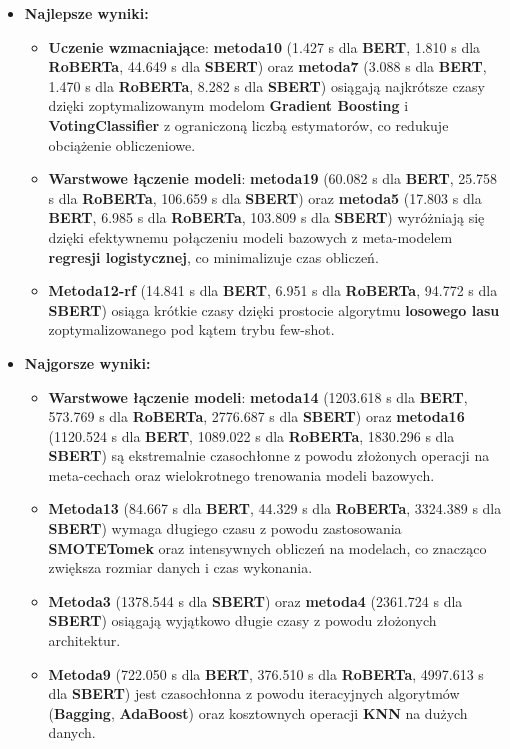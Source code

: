 \begin{itemize}
	\item \textbf{Najlepsze wyniki:}
	      \begin{itemize}
		      \item \textbf{Uczenie wzmacniające}: \textbf{metoda10} (1.427 s dla \textbf{BERT}, 1.810 s dla \textbf{RoBERTa}, 44.649 s dla \textbf{SBERT}) oraz \textbf{metoda7} (3.088 s dla \textbf{BERT}, 1.470 s dla \textbf{RoBERTa}, 8.282 s dla \textbf{SBERT}) osiągają najkrótsze czasy dzięki zoptymalizowanym modelom \textbf{Gradient Boosting} i \textbf{VotingClassifier} z ograniczoną liczbą estymatorów, co redukuje obciążenie obliczeniowe.
		      \item \textbf{Warstwowe łączenie modeli}: \textbf{metoda19} (60.082 s dla \textbf{BERT}, 25.758 s dla \textbf{RoBERTa}, 106.659 s dla \textbf{SBERT}) oraz \textbf{metoda5} (17.803 s dla \textbf{BERT}, 6.985 s dla \textbf{RoBERTa}, 103.809 s dla \textbf{SBERT}) wyróżniają się dzięki efektywnemu połączeniu modeli bazowych z meta-modelem \textbf{regresji logistycznej}, co minimalizuje czas obliczeń.
		      \item \textbf{Metoda12-rf} (14.841 s dla \textbf{BERT}, 6.951 s dla \textbf{RoBERTa}, 94.772 s dla \textbf{SBERT}) osiąga krótkie czasy dzięki prostocie algorytmu \textbf{losowego lasu} zoptymalizowanego pod kątem trybu few-shot.
	      \end{itemize}
	\item \textbf{Najgorsze wyniki:}
	      \begin{itemize}
		      \item \textbf{Warstwowe łączenie modeli}: \textbf{metoda14} (1203.618 s dla \textbf{BERT}, 573.769 s dla \textbf{RoBERTa}, 2776.687 s dla \textbf{SBERT}) oraz \textbf{metoda16} (1120.524 s dla \textbf{BERT}, 1089.022 s dla \textbf{RoBERTa}, 1830.296 s dla \textbf{SBERT}) są ekstremalnie czasochłonne z powodu złożonych operacji na meta-cechach oraz wielokrotnego trenowania modeli bazowych.
		      \item \textbf{Metoda13} (84.667 s dla \textbf{BERT}, 44.329 s dla \textbf{RoBERTa}, 3324.389 s dla \textbf{SBERT}) wymaga długiego czasu z powodu zastosowania \textbf{SMOTETomek} oraz intensywnych obliczeń na modelach, co znacząco zwiększa rozmiar danych i czas wykonania.
		      \item \textbf{Metoda3} (1378.544 s dla \textbf{SBERT}) oraz \textbf{metoda4} (2361.724 s dla \textbf{SBERT}) osiągają wyjątkowo długie czasy z powodu złożonych architektur.
		      \item \textbf{Metoda9} (722.050 s dla \textbf{BERT}, 376.510 s dla \textbf{RoBERTa}, 4997.613 s dla \textbf{SBERT}) jest czasochłonna z powodu iteracyjnych algorytmów (\textbf{Bagging}, \textbf{AdaBoost}) oraz kosztownych operacji \textbf{KNN} na dużych danych.
	      \end{itemize}
\end{itemize}

